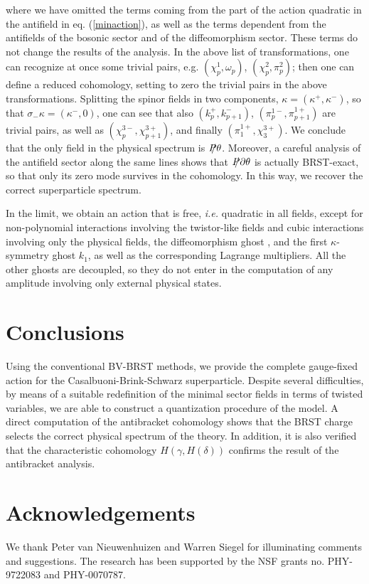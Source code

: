 \documentclass[a4paper,12pt]{article}
\begin{document}
 where we have omitted the terms coming from the part of the action
 quadratic in the antifield in eq. (\ref{minaction}), as well as the
 terms dependent from the antifields of the bosonic sector and of the
 diffeomorphism sector. These terms do not change the results of the
 analysis.  In the above list of transformations, one can recognize at
 once some trivial pairs, e.g. $(\chi_p^1, \omega_p)$, $(\chi_p^2,
 \pi_p^2)$; then one can define a reduced cohomology, setting to zero
 the trivial pairs in the above transformations.  Splitting the spinor
 fields in two components, $\kappa = (\kappa^+, \kappa^-)$, so that
 $\sigma_- \kappa = (\kappa^-, 0)$, one can see that also $(k_p^+,
 k_{p+1}^-)$, $(\pi_{p}^{1-}, \pi_{p+1}^{1+})$ are trivial pairs, as
 well as $(\chi_{p}^{3-}, \chi_{p+1}^{3+})$, and finally
 $(\pi_{1}^{1+},\chi_{3}^{3+})$. We conclude that the only field in the
 physical spectrum is $\SL{P} \theta$. Moreover, a careful analysis of
 the antifield sector along the same lines shows that $\SL{P} \partial
 \theta$ is actually BRST-exact, so that only its zero mode survives
 in the cohomology. In this way, we recover the correct superparticle
 spectrum.
 
 In the limit, we obtain an action that is free, {\it i.e.} quadratic
 in all fields, except for non-polynomial interactions involving the
 twistor-like fields and cubic interactions involving only the
 physical fields, the diffeomorphism ghost , and the first
 $\kappa$-symmetry ghost $k_1$, as well as the corresponding Lagrange
 multipliers. All the other ghosts are decoupled, so they do not enter
 in the computation of any amplitude involving only external physical
 states.

\section{Conclusions}

Using the conventional BV-BRST methods, we provide the complete
gauge-fixed action for the Casalbuoni-Brink-Schwarz superparticle.
Despite several difficulties, by means of a suitable redefinition of
the minimal sector fields in terms of twisted variables, we are able
to construct a quantization procedure of the model. A direct
computation of the antibracket cohomology shows that the BRST charge
selects the correct physical spectrum of the theory. In addition, it
is also verified that the characteristic cohomology
$H(\gamma,H(\delta))$ confirms the result of the antibracket analysis.

\section*{Acknowledgements}
\noindent
We thank Peter van Nieuwenhuizen and Warren Siegel for illuminating
comments and suggestions. The research has been supported by the NSF
grants no. PHY-9722083 and PHY-0070787.
\end{document}
